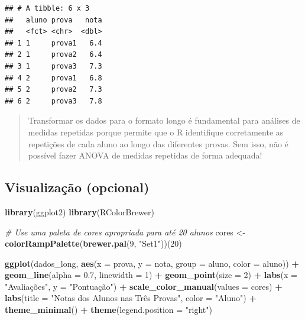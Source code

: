 \documentclass[
]{book}
\newenvironment{Shaded}{\begin{snugshade}}{\end{snugshade}}
\newcommand{\AttributeTok}[1]{\textcolor[rgb]{0.13,0.29,0.53}{#1}}
\newcommand{\CommentTok}[1]{\textcolor[rgb]{0.56,0.35,0.01}{\textit{#1}}}
\newcommand{\DecValTok}[1]{\textcolor[rgb]{0.00,0.00,0.81}{#1}}
\newcommand{\FloatTok}[1]{\textcolor[rgb]{0.00,0.00,0.81}{#1}}
\newcommand{\FunctionTok}[1]{\textcolor[rgb]{0.13,0.29,0.53}{\textbf{#1}}}
\newcommand{\NormalTok}[1]{#1}
\newcommand{\OtherTok}[1]{\textcolor[rgb]{0.56,0.35,0.01}{#1}}
\newcommand{\SpecialCharTok}[1]{\textcolor[rgb]{0.81,0.36,0.00}{\textbf{#1}}}
\newcommand{\StringTok}[1]{\textcolor[rgb]{0.31,0.60,0.02}{#1}}
\begin{document}
\begin{verbatim}
## # A tibble: 6 x 3
##   aluno prova   nota
##   <fct> <chr>  <dbl>
## 1 1     prova1   6.4
## 2 1     prova2   6.4
## 3 1     prova3   7.3
## 4 2     prova1   6.8
## 5 2     prova2   7.3
## 6 2     prova3   7.8
\end{verbatim}

\begin{quote}
Transformar os dados para o formato longo é fundamental para análises de medidas repetidas porque permite que o R identifique corretamente as repetições de cada aluno ao longo das diferentes provas. Sem isso, não é possível fazer ANOVA de medidas repetidas de forma adequada!
\end{quote}

\subsection{Visualização (opcional)}\label{visualizauxe7uxe3o-opcional}

\begin{Shaded}
\begin{Highlighting}[]
\FunctionTok{library}\NormalTok{(ggplot2)}
\FunctionTok{library}\NormalTok{(RColorBrewer)}

\CommentTok{\# Use uma paleta de cores apropriada para até 20 alunos}
\NormalTok{cores }\OtherTok{\textless{}{-}} \FunctionTok{colorRampPalette}\NormalTok{(}\FunctionTok{brewer.pal}\NormalTok{(}\DecValTok{9}\NormalTok{, }\StringTok{"Set1"}\NormalTok{))(}\DecValTok{20}\NormalTok{)}

\FunctionTok{ggplot}\NormalTok{(dados\_long, }\FunctionTok{aes}\NormalTok{(}\AttributeTok{x =}\NormalTok{ prova, }\AttributeTok{y =}\NormalTok{ nota, }\AttributeTok{group =}\NormalTok{ aluno, }\AttributeTok{color =}\NormalTok{ aluno)) }\SpecialCharTok{+}
  \FunctionTok{geom\_line}\NormalTok{(}\AttributeTok{alpha =} \FloatTok{0.7}\NormalTok{, }\AttributeTok{linewidth =} \DecValTok{1}\NormalTok{) }\SpecialCharTok{+}
  \FunctionTok{geom\_point}\NormalTok{(}\AttributeTok{size =} \DecValTok{2}\NormalTok{) }\SpecialCharTok{+}
  \FunctionTok{labs}\NormalTok{(}\AttributeTok{x =} \StringTok{"Avaliações"}\NormalTok{, }\AttributeTok{y =} \StringTok{"Pontuação"}\NormalTok{) }\SpecialCharTok{+}
  \FunctionTok{scale\_color\_manual}\NormalTok{(}\AttributeTok{values =}\NormalTok{ cores) }\SpecialCharTok{+}
  \FunctionTok{labs}\NormalTok{(}\AttributeTok{title =} \StringTok{"Notas dos Alunos nas Três Provas"}\NormalTok{, }\AttributeTok{color =} \StringTok{"Aluno"}\NormalTok{) }\SpecialCharTok{+}
  \FunctionTok{theme\_minimal}\NormalTok{() }\SpecialCharTok{+}
  \FunctionTok{theme}\NormalTok{(}\AttributeTok{legend.position =} \StringTok{"right"}\NormalTok{)}
\end{Highlighting}
\end{Shaded}
\end{document}
